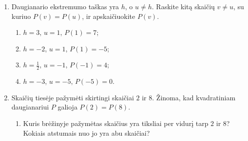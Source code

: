 \documentclass[12pt,a4paper]{article}
\begin{document}
\begin{enumerate}
\begin{center}
\end{center}
\begin{enumerate}
\item Įrodykite, kad kiekvienam realiajam $t$ galioja $P(h-t)=P(h+t)$.
\item Paaiškinkite šios lygybės prasmę, kai $t>0$. Kokiu atstumu nuo $h$ yra skaičiai $h-t$ ir $h+t$?
\item Ar lygybė galioja, kai $t=0$? O kai $t<0$? Paaiškinkite, kas tada nutinka skaičiams $h-t$ ir $h+t$.
\end{enumerate}
\par\medskip
\textbf{Sustokite ir apibendrinkite.} Kodėl skaičiai $h-t$ ir $h+t$ duoda tą pačią daugianario reikšmę? Kaip rasti skaičiui $u$ simetrišką skaičių?
\item Daugianario ekstremumo taškas yra $h$, o $u\ne h$. Raskite kitą skaičių $v\ne u$, su kuriuo $P(v)=P(u)$, ir apskaičiuokite $P(v)$.
\begin{enumerate}
\item $h=3$, $u=1$, $P(1)=7$;
\item $h=-2$, $u=1$, $P(1)=-5$;
\item $h=\frac{1}{2}$, $u=-1$, $P(-1)=4$;
\item $h=-3$, $u=-5$, $P(-5)=0$.
\end{enumerate}
\item Skaičių tiesėje pažymėti skirtingi skaičiai $2$ ir $8$. Žinoma, kad kvadratiniam daugianariui $P$ galioja $P(2)=P(8)$.
\begin{center}\end{center}
\begin{enumerate}
\item Kuris brėžinyje pažymėtas skaičius yra tiksliai per vidurį tarp $2$ ir $8$? Kokiais atstumais nuo jo yra abu skaičiai?

\end{enumerate}
\end{enumerate}
\end{document}
